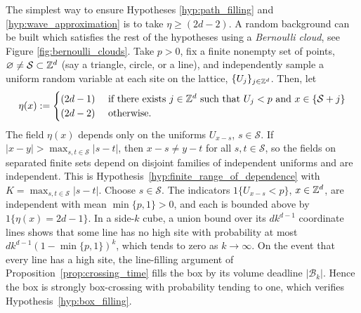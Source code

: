 \documentclass[12pt]{amsart}
\begin{document}
The simplest way to ensure Hypotheses \ref{hyp:path_filling} and \ref{hyp:wave_approximation}
is to take $\eta \geq (2 d - 2)$. A random background can be built which satisfies the 
rest of the hypotheses using a {\it Bernoulli cloud}, see Figure \ref{fig:bernoulli_clouds}. Take $p > 0$, fix a finite nonempty set of points, $\varnothing\ne\mathcal{S} \subset \mathbb{Z}^d$ (say a triangle, circle, or a line), and independently sample a uniform random variable at each site on the lattice, $\{U_j\}_{j \in \mathbb{Z}^d}$. 
Then, let 
\begin{equation} \label{eq:bernoulli_cloud}
\eta(x)  :=  
\begin{cases} (2 d- 1)  & \mbox{ if there exists $j \in \mathbb{Z}^d$ such that $U_j < p$ and $x \in \{ \mathcal{S} + j \}$} \\
(2d - 2) & \mbox{ otherwise.}
\end{cases}
\end{equation}
The field $\eta(x)$ depends only on the uniforms $U_{x-s}$, $s\in\mathcal S$. If $|x-y|>\max_{s,t\in\mathcal S}|s-t|$, then $x-s\neq y-t$ for all $s,t\in\mathcal S$, so the fields on separated finite sets depend on disjoint families of independent uniforms and are independent. This is Hypothesis~\ref{hyp:finite_range_of_dependence} with $K=\max_{s,t\in\mathcal S}|s-t|$. Choose $s\in\mathcal S$. The indicators $1\{U_{x-s}<p\}$, $x\in\mathbb{Z}^d$, are independent with mean $\min\{p,1\}>0$, and each is bounded above by $1\{\eta(x)=2d-1\}$. In a side-$k$ cube, a union bound over its $dk^{d-1}$ coordinate lines shows that some line has no high site with probability at most $dk^{d-1}(1-\min\{p,1\})^k$, which tends to zero as $k\to\infty$. On the event that every line has a high site, the line-filling argument of Proposition~\ref{prop:crossing_time} fills the box by its volume deadline $|\mathcal B_k|$. Hence the box is strongly box-crossing with probability tending to one, which verifies Hypothesis~\ref{hyp:box_filling}.
\end{document}
